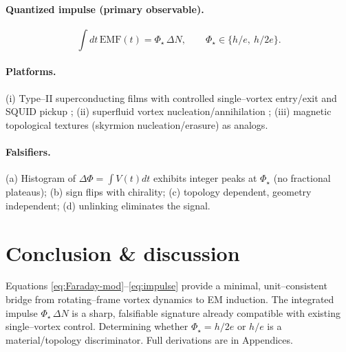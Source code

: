 \documentclass[12pt]{article}
\begin{document}
    \paragraph{Quantized impulse (primary observable).}
        \begin{equation}
        \int dt\,\mathrm{EMF}(t)=\Phi_\star\,\Delta N,\qquad
        \Phi_\star\in\{h/e,\ h/2e\}.
        \label{eq:obs}
        \end{equation}
    \paragraph{Platforms.} (i) Type–II superconducting films with controlled single–vortex entry/exit and SQUID pickup \cite{Deaver1961,Doll1961}; (ii) superfluid vortex nucleation/annihilation \cite{Feynman1955}; (iii) magnetic topological textures (skyrmion nucleation/erasure) as analogs.
    \paragraph{Falsifiers.} (a) Histogram of $\Delta\Phi=\int V(t)dt$ exhibits integer peaks at $\Phi_\star$ (no fractional plateaus); (b) sign flips with chirality; (c) topology dependent, geometry independent; (d) unlinking eliminates the signal.

\section{Conclusion \& discussion}
Equations \eqref{eq:Faraday-mod}–\eqref{eq:impulse} provide a minimal, unit–consistent bridge from rotating–frame vortex dynamics to EM induction. The integrated impulse $\Phi_\star\,\Delta N$ is a sharp, falsifiable signature already compatible with existing single–vortex control. Determining whether $\Phi_\star=h/2e$ or $h/e$ is a material/topology discriminator. Full derivations are in Appendices.

\appendix
\end{document}
